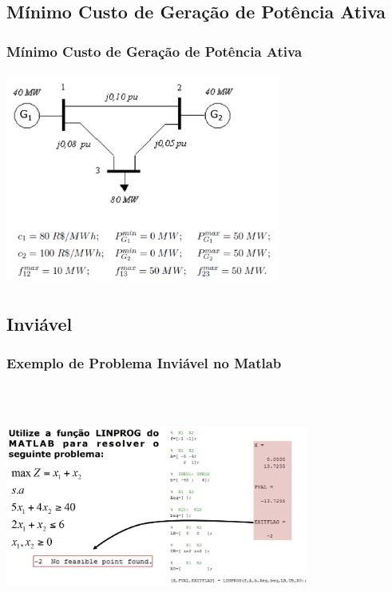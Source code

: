 \documentclass{beamer}
\begin{document}
\begin{frame}
{	}
\end{frame}

\subsection{Mínimo Custo de Geração de Potência Ativa}
\begin{frame}
	\frametitle{Mínimo Custo de Geração de Potência Ativa}
	\centering
	\includegraphics[width=9cm,height=7cm]{PotenciaAtiva.png}
\end{frame}

\subsection{Inviável}
\begin{frame}
	\frametitle{Exemplo de Problema Inviável no Matlab} 
	\centering
	\includegraphics[width=10cm,height=8cm]{inviavel.png}	
\end{frame}
\end{document}
